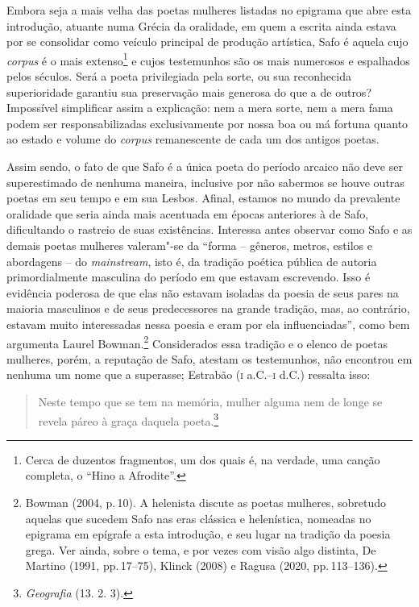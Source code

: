 Embora seja a mais velha das poetas mulheres listadas no epigrama que abre esta
introdução, atuante numa Grécia da oralidade, em quem a escrita ainda estava
por se consolidar como veículo principal de produção artística, Safo é aquela
cujo \textit{corpus} é o mais extenso\footnote{Cerca de duzentos fragmentos, um dos quais é,
na verdade, uma canção completa, o “Hino a Afrodite”.} e cujos testemunhos são
os mais numerosos e espalhados pelos séculos. Será a poeta
privilegiada pela sorte, ou sua reconhecida superioridade garantiu sua
preservação mais generosa do que a de outros?
Impossível simplificar assim a explicação:
nem a mera sorte, nem a mera fama podem ser responsabilizadas exclusivamente por
nossa boa ou má fortuna quanto ao estado e volume do \textit{corpus}
remanescente de cada um dos antigos poetas.

Assim sendo, o fato de que Safo é a única poeta do período
arcaico não deve ser superestimado de nenhuma maneira, inclusive por não sabermos se houve outras poetas em seu tempo e em sua Lesbos. Afinal, estamos no mundo da prevalente oralidade que seria ainda mais acentuada em épocas anteriores à de Safo, dificultando o rastreio de suas existências. Interessa antes observar como Safo e as demais poetas mulheres valeram"-se da ``forma -- gêneros, metros, estilos e abordagens -- do \textit{mainstream}, isto é, da tradição poética pública de autoria primordialmente masculina do período em que estavam escrevendo. Isso é evidência poderosa de que elas não estavam isoladas da poesia de seus pares na maioria masculinos e de seus predecessores na grande tradição, mas, ao contrário, estavam muito interessadas nessa poesia e eram por ela influenciadas'', como bem argumenta Laurel Bowman.\footnote{Bowman (2004, p.\,10). A helenista discute as poetas mulheres, sobretudo aquelas que sucedem Safo nas eras clássica e helenística, nomeadas no epigrama em epígrafe a esta introdução, e seu lugar na tradição da poesia grega. Ver ainda, sobre o tema, e por vezes com visão algo distinta, De Martino (1991, pp.\,17--75), Klinck (2008) e Ragusa (2020, pp.\,113--136).}
Considerados essa tradição e o elenco de poetas mulheres, porém,
a reputação de Safo, atestam os
testemunhos, não encontrou em nenhuma um nome que a
superasse; Estrabão (\textsc{i} a.C.--\textsc{i} d.C.) ressalta isso: 

\begin{quote}
Neste tempo que se tem na memória, mulher alguma nem de longe se revela páreo à graça daquela poeta.\footnote{ \textit{Geografia} (13. 2. 3).}
\end{quote}

